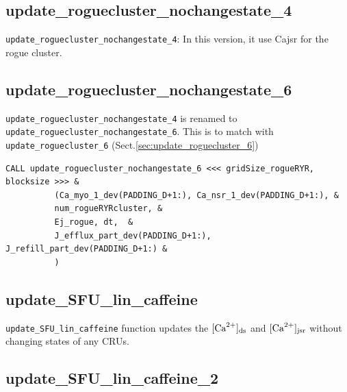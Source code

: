 \subsection{update\_roguecluster\_nochangestate\_4}

\verb!update_roguecluster_nochangestate_4!: In this version, it use Cajsr for
the rogue cluster. 

\subsection{update\_roguecluster\_nochangestate\_6}

\verb!update_roguecluster_nochangestate_4! is renamed to  
\verb!update_roguecluster_nochangestate_6!. This is to match with
\verb!update_roguecluster_6! (Sect.\ref{sec:update_roguecluster_6})

\begin{verbatim}
CALL update_roguecluster_nochangestate_6 <<< gridSize_rogueRYR, blocksize >>> &                                                                                                                                
          (Ca_myo_1_dev(PADDING_D+1:), Ca_nsr_1_dev(PADDING_D+1:), &                                                                                                                                                
          num_rogueRYRcluster, &                                                                                                                                                                                    
          Ej_rogue, dt,  &                                                                                                                                                                                          
          J_efflux_part_dev(PADDING_D+1:), J_refill_part_dev(PADDING_D+1:) &                                                                                                                                        
          )                
\end{verbatim}

\subsection{update\_SFU\_lin\_caffeine}
\label{sec:update_SFU_lin_caffeine}

\verb!update_SFU_lin_caffeine! function updates the $[{\text{Ca}^{2+}}]_{\text{ds}}$ and $[{\text{Ca}^{2+}}]_{\text{jsr}}$
without changing states of any CRUs.

\subsection{update\_SFU\_lin\_caffeine\_2}
\label{sec:update_SFU_lin_caffeine_2}

